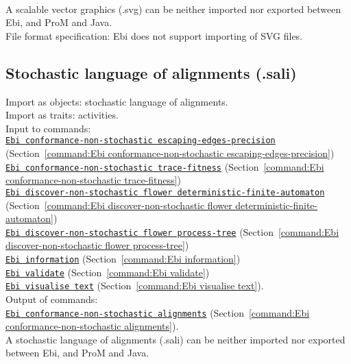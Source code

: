 {\\A scalable vector graphics (.svg) can be neither imported nor exported between Ebi, and ProM and Java.
\\File format specification:
Ebi does not support importing of SVG files.
\clearpage
\subsection{Stochastic language of alignments (.sali)}
\label{filehandler:stochastic language of alignments}
Import as objects: stochastic language of alignments.
\\Import as traits: activities.
\\Input to commands: \\\null\qquad\hyperref[command:Ebi conformance-non-stochastic escaping-edges-precision]{\texttt{Ebi conformance-non-stochastic escaping-edges-precision}} (Section~\ref{command:Ebi conformance-non-stochastic escaping-edges-precision})\\\null\qquad\hyperref[command:Ebi conformance-non-stochastic trace-fitness]{\texttt{Ebi conformance-non-stochastic trace-fitness}} (Section~\ref{command:Ebi conformance-non-stochastic trace-fitness})\\\null\qquad\hyperref[command:Ebi discover-non-stochastic flower deterministic-finite-automaton]{\texttt{Ebi discover-non-stochastic flower deterministic-finite-automaton}} (Section~\ref{command:Ebi discover-non-stochastic flower deterministic-finite-automaton})\\\null\qquad\hyperref[command:Ebi discover-non-stochastic flower process-tree]{\texttt{Ebi discover-non-stochastic flower process-tree}} (Section~\ref{command:Ebi discover-non-stochastic flower process-tree})\\\null\qquad\hyperref[command:Ebi information]{\texttt{Ebi information}} (Section~\ref{command:Ebi information})\\\null\qquad\hyperref[command:Ebi validate]{\texttt{Ebi validate}} (Section~\ref{command:Ebi validate})\\\null\qquad\hyperref[command:Ebi visualise text]{\texttt{Ebi visualise text}} (Section~\ref{command:Ebi visualise text}).
\\Output of commands: \\\null\qquad\hyperref[command:Ebi conformance-non-stochastic alignments]{\texttt{Ebi conformance-non-stochastic alignments}} (Section~\ref{command:Ebi conformance-non-stochastic alignments}).
\\A stochastic language of alignments (.sali) can be neither imported nor exported between Ebi, and ProM and Java.
}
